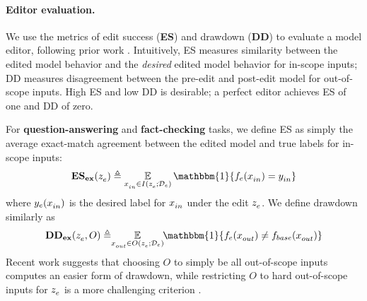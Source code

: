 \documentclass{article}
\begin{document}
\paragraph{Editor evaluation.} 
We use the metrics of edit success (\textbf{ES}) and drawdown (\textbf{DD}) to evaluate a model editor, following prior work \citep{Sinitsin2020Editable,Cao2021EditingFK,mitchell2021fast,hase2021language}. Intuitively, ES measures similarity between the edited model behavior and the \textit{desired} edited model behavior for in-scope inputs; DD measures disagreement between the pre-edit and post-edit model for out-of-scope inputs. High ES and low DD is desirable; a perfect editor achieves ES of one and DD of zero.%

For \textbf{question-answering} and \textbf{fact-checking} tasks, we define ES as simply the average exact-match agreement between the edited model and true labels for in-scope inputs:
\begin{equation}
    \mathbf{ES_{ex}}(\ze) \triangleq \E_{\xtest \in I(\ze; \editdata)} \mathbbm{1}\{\editedmodel(\xtest) = \ytest\}
\end{equation}
where $\ye[\xtest]$ is the desired label for $x_{in}^{}$ under the edit $z_e^{}$.
We define drawdown similarly as
\begin{equation}
    \mathbf{DD_{ex}}(\ze,O) \triangleq \hspace{-1mm}\E_{\xloc \in O(\ze; \editdata)}\hspace{-1mm} \mathbbm{1}\{\editedmodel(\xloc) \neq \basemodel(\xloc)\}
\end{equation}
Recent work suggests that choosing $O$ to simply be all out-of-scope inputs computes an easier form of drawdown, while restricting $O$ to hard out-of-scope inputs for $z_e^{}$ is a more challenging criterion \citep{hase2021language}.
\end{document}
